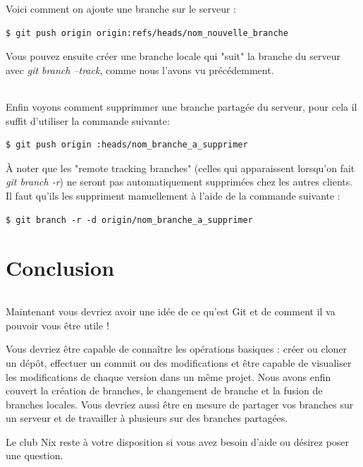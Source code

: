 \documentclass[french, a4paper, 12pt, titlepage]{article}
\begin{document}
Voici comment on ajoute une branche sur le serveur :
\begin{lstlisting}
$ git push origin origin:refs/heads/nom_nouvelle_branche
\end{lstlisting}
Vous pouvez ensuite créer une branche locale qui "suit" la branche du serveur avec \emph{git branch --track}, comme nous l’avons vu précédemment.

\paragraph{}Enfin voyons comment supprimmer une branche partagée du serveur, pour cela il suffit d'utiliser la commande suivante:
\begin{lstlisting}
$ git push origin :heads/nom_branche_a_supprimer
\end{lstlisting}
À noter que les "remote tracking branches" (celles qui apparaissent lorsqu’on fait  \emph{git branch -r}) ne seront pas automatiquement supprimées chez les autres clients. Il faut qu’ils les suppriment manuellement à l’aide de la commande suivante :
\begin{lstlisting}
$ git branch -r -d origin/nom_branche_a_supprimer
\end{lstlisting}


\newpage
\part{Conclusion}
\paragraph{}Maintenant vous devriez avoir une idée de ce qu'est Git et de comment il va pouvoir vous être utile !

Vous devriez être capable de connaître les opérations basiques : créer ou cloner un dépôt, effectuer un commit ou des modifications et être capable de visualiser les modifications de chaque version dans un même projet.
Nous avons enfin couvert la création de branches, le changement de branche et la fusion de branches locales.
Vous devriez aussi être en mesure de partager vos branches sur un serveur et de travailler à plusieurs sur des branches partagées.

Le club Nix reste à votre disposition si vous avez besoin d'aide ou désirez poser une question.



%
%
\end{document}
